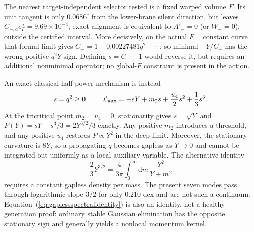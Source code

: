 \documentclass[10pt]{article}
\newcommand{\dd}{\mathrm{d}}
\begin{document}
The nearest target-independent selector tested is a fixed warped volume $F$.
Its unit tangent is only $0.0686^\circ$ from the lower-brane silent direction,
but leaves $C_{-,a}e_F^a=9.69\times10^{-4}$; exact alignment is equivalent to
$A'_-=0$ (or $W_-=0$), outside the certified interval.  More decisively, on
the actual $F=$constant curve that formal limit gives
$C_-=1+0.00227481q^2+\cdots$, so minimal $-Y/C_-$ has the wrong positive
$q^2Y$ sign.  Defining $s=C_--1$ would reverse it, but requires an additional
nonminimal operator; no global-$F$ constraint is present in the action.

An exact classical half-power mechanism is instead
\begin{equation}
 s=q^2\geq0,\qquad
 {\cal L}_{\rm aux}=-sY+m_2s+\frac{u_4}{2}s^2+\frac13s^3 .
 \label{eq:tricriticalselector}
\end{equation}
At the tricritical point $m_2=u_4=0$, stationarity gives
$s=\sqrt Y$ and $P(Y)=sY-s^3/3=2Y^{3/2}/3$ exactly.  Any positive $m_2$
introduces a threshold, and any positive $u_4$ restores $P\propto Y^2$ in the
deep limit.  Moreover, the stationary curvature is $8Y$, so a propagating $q$
becomes gapless as $Y\rightarrow0$ and cannot be integrated out uniformly as a
local auxiliary variable.  The alternative identity
\begin{equation}
 \frac23Y^{3/2}=\frac{4}{3\pi}\int_0^\infty
 \dd m\,\frac{Y^2}{Y+m^2}
 \label{eq:gaplessspectralidentity}
\end{equation}
requires a constant gapless density per mass.  The present seven modes pass
through logarithmic slope $3/2$ for only $0.210$ dex and are not such a
continuum.  Equation~(\ref{eq:gaplessspectralidentity}) is also an identity, not
a healthy generation proof: ordinary stable Gaussian elimination has the
opposite stationary sign and generally yields a nonlocal momentum kernel.
\end{document}
